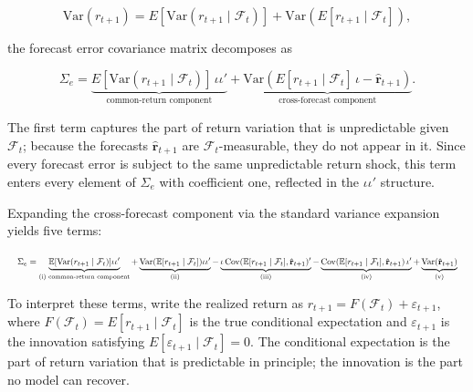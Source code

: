 \documentclass[a4paper,11pt]{article}
\begin{document}
\begin{equation*}
\mathrm{Var}(r_{t+1}) = E[\mathrm{Var}(r_{t+1} \mid \mathcal{F}_t)] + \mathrm{Var}(E[r_{t+1} \mid \mathcal{F}_t]),
\end{equation*}

\noindent the forecast error covariance matrix decomposes as

\begin{equation}
\Sigma_e = \underbrace{E[\mathrm{Var}(r_{t+1} \mid \mathcal{F}_t)] \, \iota\iota'}_{\text{common-return component}} + \underbrace{\mathrm{Var}\!\left(E[r_{t+1} \mid \mathcal{F}_t]\,\iota - \hat{\mathbf{r}}_{t+1}\right)}_{\text{cross-forecast component}}. \label{eq:2}
\end{equation}

The first term captures the part of return variation that is unpredictable given $\mathcal{F}_t$; because the forecasts $\hat{\mathbf{r}}_{t+1}$ are $\mathcal{F}_t$-measurable, they do not appear in it. Since every forecast error is subject to the same unpredictable return shock, this term enters every element of $\Sigma_e$ with coefficient one, reflected in the $\iota\iota'$ structure.

Expanding the cross-forecast component via the standard variance expansion yields five terms:

\begin{equation}\label{eq:cross-forecast-expand-resize}
\resizebox{\textwidth}{!}{$
    \Sigma_e =
    \underbrace{\mathbb{E}[\mathrm{Var}(r_{t+1} \mid \mathcal{F}_t)]\iota\iota'}_{\text{(i) common-return component}}
    + \underbrace{\mathrm{Var}(\mathbb{E}[r_{t+1} \mid \mathcal{F}_t])\iota\iota'}_{\text{(ii)}}
    - \underbrace{\iota\,\mathrm{Cov}(\mathbb{E}[r_{t+1} \mid \mathcal{F}_t], \hat{\mathbf{r}}_{t+1})'}_{\text{(iii)}}
    - \underbrace{\mathrm{Cov}(\mathbb{E}[r_{t+1} \mid \mathcal{F}_t], \hat{\mathbf{r}}_{t+1})\,\iota'}_{\text{(iv)}}
    + \underbrace{\mathrm{Var}(\hat{\mathbf{r}}_{t+1})}_{\text{(v)}}
$}
\end{equation}

To interpret these terms, write the realized return as $r_{t+1} = F(\mathcal{F}_t) + \varepsilon_{t+1}$, where $F(\mathcal{F}_t) = E[r_{t+1} \mid \mathcal{F}_t]$ is the true conditional expectation and $\varepsilon_{t+1}$ is the innovation satisfying $E[\varepsilon_{t+1} \mid \mathcal{F}_t] = 0$. The conditional expectation is the part of return variation that is predictable in principle; the innovation is the part no model can recover.
\end{document}
